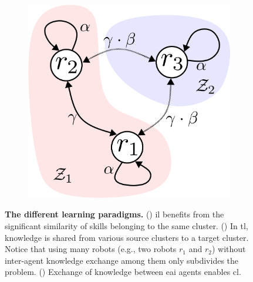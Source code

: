 \documentclass[12pt]{article}
\begin{document}
\begin{figure}[!t]
\begin{subfigure}[t]{0.32\textwidth}
	\end{subfigure}
	\hfill
	\begin{subfigure}[t]{0.32\textwidth}
		\subcaption{}
		\includegraphics[width=\textwidth]{cl_example_figure.png} \label{fig:cl_example_figure}
	\end{subfigure}	
	\hspace*{\fill}
	\caption[] {\label{fig:learning_paradigms_conceptual_figure} \textbf{The different learning paradigms.} () \Acl{il} benefits from the significant similarity of skills belonging to the same cluster. () In \acl{tl}, knowledge is shared from various source clusters to a target cluster. Notice that using many robots (e.g., two robots $r_1$ and $r_2$) without inter-agent knowledge exchange among them only subdivides the problem. () Exchange of knowledge between \ac{eai} agents enables \acl{cl}.}
\end{figure}

\end{document}
